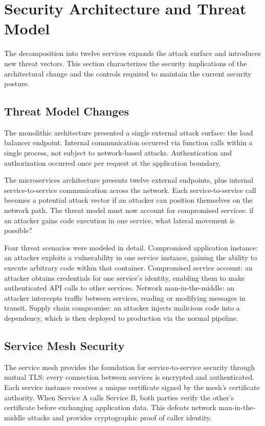 \section{Security Architecture and Threat Model}

The decomposition into twelve services expands the attack surface and introduces new threat vectors. This section characterizes the security implications of the architectural change and the controls required to maintain the current security posture.

\subsection{Threat Model Changes}

The monolithic architecture presented a single external attack surface: the load balancer endpoint. Internal communication occurred via function calls within a single process, not subject to network-based attacks. Authentication and authorization occurred once per request at the application boundary.

The microservices architecture presents twelve external endpoints, plus internal service-to-service communication across the network. Each service-to-service call becomes a potential attack vector if an attacker can position themselves on the network path. The threat model must now account for compromised services: if an attacker gains code execution in one service, what lateral movement is possible?

Four threat scenarios were modeled in detail. Compromised application instance: an attacker exploits a vulnerability in one service instance, gaining the ability to execute arbitrary code within that container. Compromised service account: an attacker obtains credentials for one service's identity, enabling them to make authenticated API calls to other services. Network man-in-the-middle: an attacker intercepts traffic between services, reading or modifying messages in transit. Supply chain compromise: an attacker injects malicious code into a dependency, which is then deployed to production via the normal pipeline.

\subsection{Service Mesh Security}

The service mesh provides the foundation for service-to-service security through mutual TLS: every connection between services is encrypted and authenticated. Each service instance receives a unique certificate signed by the mesh's certificate authority. When Service A calls Service B, both parties verify the other's certificate before exchanging application data. This defeats network man-in-the-middle attacks and provides cryptographic proof of caller identity.

